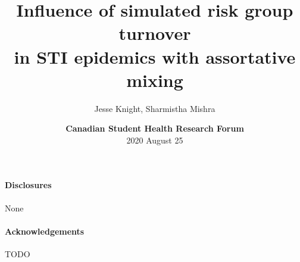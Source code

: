 \documentclass[aspectratio=169]{beamer}
\title[Influence of risk group turnover under assortative mixing]
      {Influence of simulated risk group turnover\\
       in STI epidemics with assortative mixing}
\author{Jesse Knight, Sharmistha Mishra}
\institute{Institute of Medical Science\\University of Toronto}
\date{\textbf{Canadian Student Health Research Forum}\\[0.5em]\scriptsize
  2020 August 25}
\begin{document}
\begin{frame}
  \maketitle
\end{frame}
\begin{frame}
  \paragraph{Disclosures}
  \xpar
  None
  \vfill
  \paragraph{Acknowledgements}
  \xpar
  TODO
\end{frame}
\end{document}
